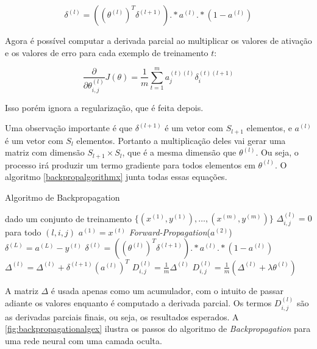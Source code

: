 \begin{equation}
\delta^{(l)} = ((\theta^{(l)})^T \delta^{(l+1)}) .* a^{(l)} .* (1 - a^{(l)}) \nonumber
\end{equation}

Agora é possível computar a derivada parcial ao multiplicar os valores de ativação e os valores de erro para cada exemplo de treinamento $t$:

\begin{equation}
\frac{\partial}{\partial\theta_{i,j}^{(l)}} J(\theta) = \frac{1}{m} \sum\limits_{t=1}^{m} a_j^{(t)(l)} \delta_i^{(t)(l+1)} \nonumber
\end{equation}

Isso porém ignora a regularização, que é feita depois.

Uma observação importante é que $\delta^{(l+1)}$ é um vetor com $S_{l+1}$ elementos, e $a^{(l)}$ é um vetor com $S_l$ elementos. Portanto a multiplicação deles vai gerar uma matriz com dimensão $S_{l+1} \times S_l$, que é a mesma dimensão que $\theta^{(l)}$. Ou seja, o processo irá produzir um termo gradiente para todos elementos em $\theta^{(l)}$. O algoritmo \ref{backpropalgorithmx} junta todas essas equações.

\begin{algorithm} 
\caption{Algoritmo de Backpropagation} \label{backpropalgorithmx}
\begin{algorithmic}
	\State dado um conjunto de treinamento $\{(x^{(1)}, y^{(1)}), \ldots, (x^{(m)}, y^{(m)}) \}$
	\State $\Delta_{i,j}^{(l)} = 0$ para todo $(l, i, j)$
		\State $a^{(1)} = x^{(t)}$
		\State \textit{Forward-Propagation}($a^{(2)}$)
		\State $\delta^{(L)} = a^{(L)} - y^{(t)}$
      \State $\delta^{(l)} = ((\theta^{(l)})^T \delta^{(l+1)}) .* a^{(l)} .* (1 - a^{(l)})$
		  \State $\Delta^{(l)} = \Delta^{(l)} + \delta^{(l+1)}(a^{(l)})^T $
    \EndFor
	\EndFor
			\State $D_{i,j}^{(l)} = \frac{1}{m}\Delta^{(l)}$
		\Else
			\State $D_{i,j}^{(l)} = \frac{1}{m}(\Delta^{(l)} + \lambda\theta^{(l)})$
		\EndIf
\EndProcedure
\end{algorithmic}
\end{algorithm}

A matriz $\Delta$ é usada apenas como um acumulador, com o intuito de passar adiante os valores enquanto é computado a derivada parcial. Os termos $D_{i,j}^{(l)}$ são as derivadas parciais finais, ou seja, os resultados esperados. A \autoref{fig:backpropagationalgex} ilustra os passos do algoritmo de \textit{Backpropagation} para uma rede neural com uma camada oculta.

